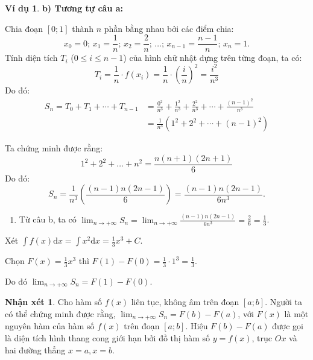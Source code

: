 \documentclass[12pt,a4paper,oneside]{book}
\theoremstyle{theorem}
\theoremstyle{definition}
\newtheorem{nx}[theorem2]{Nhận xét}
\newtheorem{vd}[theorem2]{Ví dụ}
\begin{document}
\begin{vd}
\noindent \textbf{b) Tương tự câu a:}

Chia đoạn $[0; 1]$ thành $n$ phần bằng nhau bởi các điểm chia:
\[
x_0 = 0;\, x_1 = \frac{1}{n};\, x_2 = \frac{2}{n};\, \dots;\, x_{n-1} = \frac{n-1}{n};\, x_n = 1.
\]
Tính diện tích $T_i$ ($0 \le i \le n - 1$) của hình chữ nhật dựng trên từng đoạn, ta có:
\[
T_i = \frac{1}{n} \cdot f(x_i) = \frac{1}{n} \cdot \left(\frac{i}{n}\right)^2 = \frac{i^2}{n^3}
\]
Do đó:
\begin{align*}
S_n = T_0 + T_1 + \cdots + T_{n-1} &= \frac{0^2}{n^3} + \frac{1^2}{n^3} + \frac{2^2}{n^3} + \cdots + \frac{(n-1)^2}{n^3} \\[0.8em]
&= \frac{1}{n^3} (1^2 + 2^2 + \cdots + (n-1)^2)
\end{align*}

Ta chứng minh được rằng:
\[
1^2 + 2^2 + \dots + n^2 = \frac{n(n + 1)(2n + 1)}{6}
\]
Do đó:
\[
S_n = \frac{1}{n^3} \left( \frac{(n - 1)n(2n - 1)}{6} \right) = \frac{(n - 1)n(2n - 1)}{6n^3}.
\]

\begin{enumerate}
    \item[c)] Từ câu b, ta có $\displaystyle\lim_{n \to +\infty} S_n = \lim_{n \to +\infty} \frac{(n - 1)n(2n - 1)}{6n^3} = \frac{2}{6} = \frac{1}{3}$.
\end{enumerate}
\vspace{0.2cm}
\noindent Xét $\int f(x) \mathrm{d}x = \int x^2 \mathrm{d}x = \frac{1}{3}x^3 + C$. 
\vspace{0.2cm}

\noindent Chọn $F(x) = \frac{1}{3}x^3$ thì $F(1) - F(0) = \frac{1}{3} \cdot 1^3 = \frac{1}{3}$.
\vspace{0.2cm}

\noindent Do đó $\displaystyle\lim_{n \to +\infty} S_n = F(1) - F(0)$.

\vspace{0.2cm}
\begin{nx}
Cho hàm số $f(x)$ liên tục, không âm trên đoạn $[a; b]$. Người ta có thể chứng minh được rằng, $\displaystyle\lim_{n \to +\infty} S_n = F(b) - F(a)$, với $F(x)$ là một nguyên hàm của hàm số $f(x)$ trên đoạn $[a; b]$. Hiệu $F(b) - F(a)$ được gọi là diện tích hình thang cong giới hạn bởi đồ thị hàm số $y = f(x)$, trục $Ox$ và hai đường thẳng $x = a, x = b$.
\end{nx}  
\end{vd}
\end{document}
